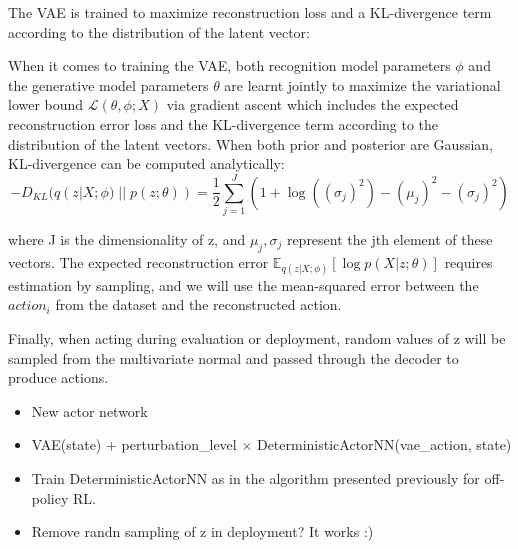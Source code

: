 The VAE is trained to maximize  reconstruction loss and a KL-divergence term according to the distribution of
the latent vector:

When it comes to training the VAE, both recognition model parameters $\phi$ and the generative model parameters $\theta$ are
learnt jointly to maximize the variational lower bound $\mathcal{L}(\theta, \phi; X)$ via gradient ascent which includes the
expected reconstruction error loss and the KL-divergence term according to the distribution of the latent vectors.
When both prior and posterior are Gaussian, KL-divergence can be computed analytically:
\begin{equation}
    - D_{KL}(q(z|X;\phi)\; ||\;p(z; \theta)) = \frac{1}{2}\sum_{j=1}^J (1+\log((\sigma_j)^2)-(\mu_j)^2-(\sigma_j)^2)
\end{equation}

where J is the dimensionality of z, and $\mu_j,\sigma_j$ represent the jth element of these vectors.
The expected reconstruction error 
$\mathbb E_{q(z|X;\phi)} [\log p(X|z; \theta)]$
requires estimation by sampling, and we will use the mean-squared error between the $action_i$ from the dataset and the reconstructed
action.

Finally, when acting during evaluation or deployment, random values of z will be sampled from the multivariate normal
and passed through the decoder to produce actions.


\begin{itemize}
    \item New actor network
    \item VAE(state) + perturbation\_level $\times$ DeterministicActorNN(vae\_action, state)
    \item Train DeterministicActorNN as in the algorithm presented previously for off-policy RL.
    \item Remove randn sampling of z in deployment? It works :)
\end{itemize}

